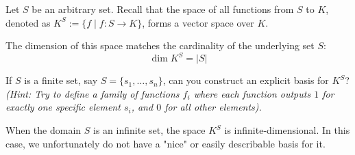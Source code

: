 \begin{example}
Let $S$ be an arbitrary set. Recall that the space of all functions from $S$ to $K$, denoted as $K^S := \{f \mid f: S \to K\}$, forms a vector space over $K$. 

The dimension of this space matches the cardinality of the underlying set $S$:
\[
\dim K^S = |S|
\]

\begin{exercise}
If $S$ is a finite set, say $S = \{s_1, \dots, s_n\}$, can you construct an explicit basis for $K^S$? \\
\textit{(Hint: Try to define a family of functions $f_i$ where each function outputs $1$ for exactly one specific element $s_i$, and $0$ for all other elements).}
\end{exercise}

\begin{remark}
When the domain $S$ is an infinite set, the space $K^S$ is infinite-dimensional. In this case, we unfortunately do not have a "nice" or easily describable basis for it.
\end{remark}
\end{example}